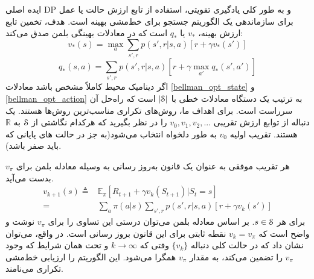 ایده اصلی DP و به طور کلی یادگیری تقویتی‌، استفاده از تابع ارزش حالت یا عمل برای سازماندهی یک الگوریتم جستجو برای خط‌مشی بهینه است.
هدف، تخمین تابع ارزش بهینه،
$v_*$
یا
$q_*$
است
که در معادلات بهینگی بلمن صدق می‌کند:
\begin{equation}
v_{*}(s) = \max_{a} \sum_{s',r} p(s',r | s,a)[r + \gamma v_*(s')]
\label{bellman_opt_state}
\end{equation}
\begin{equation}
q_{*}(s,a) = \sum_{s',r} p(s',r | s,a)[r + \gamma \max_{a'} q_* (s',a')]
\label{bellman_opt_action}
\end{equation}
اگر دینامیک محیط کاملاً مشخص باشد معادلات 
\ref{bellman_opt_state}
و
\ref{bellman_opt_action}
به ترتیب یک دستگاه معادلات خطی با
 $|\EuScript{S}|$
  است
 که راه‌حل آن سرراست است.
 برای اهداف ما، روش‌های تکراری مناسب‌ترین روش‌ها هستند. یک دنباله 
از توابع ارزش تقریبی
$ v_0 , v_1 , v_2 , ...$ 
را در نظر بگیرید که هرکدام نگاشتی از
$\EuScript{S}$ 
به 
$\mathbb{R}$
 هستند.
تقریب اولیه $v_0$
به طور دلخواه انتخاب می‌شود(به جز در حالت های پایانی که باید صفر باشد).

 هر تقریب موفقی به عنوان یک قانون به‌روز رسانی به وسیله معادله بلمن برای
$v_\pi$
بدست می‌آید. 
\begin{align}
v_{k+1}(s) \triangleq & \mathbb{E}_{\pi} [R_{t+1} + \gamma v_k(S_{t+1}) | S_t=s]  \nonumber \\
=& \sum_{a} \pi(a|s) \sum_{s',r} p(s',r | s,a)[r + \gamma v_k(s')]
\end{align}
 برای هر 
 $s \in \EuScript{S}$.
 بر اساس معادله بلمن می‌توان درستی این تساوی را برای 
$v_{\pi}$
نوشت و واضح است که 
 $v_k = v_{\pi}$
 نقطه ثابتی برای این قانون بروز رسانی است.
 در واقع، می‌توان نشان داد که در حالت کلی دنباله 
 $\{ v_k \}$
وفتی که 
$ k \rightarrow \infty $
و تحت همان شرایط که وجود 
$v_{\pi}$
را تضمین می‌کند، به مقدار 
$v_{\pi}$
همگرا می‌شود.  این الگوریتم را ارزیابی خط‌مشی تکراری
 می‌نامند.
 
